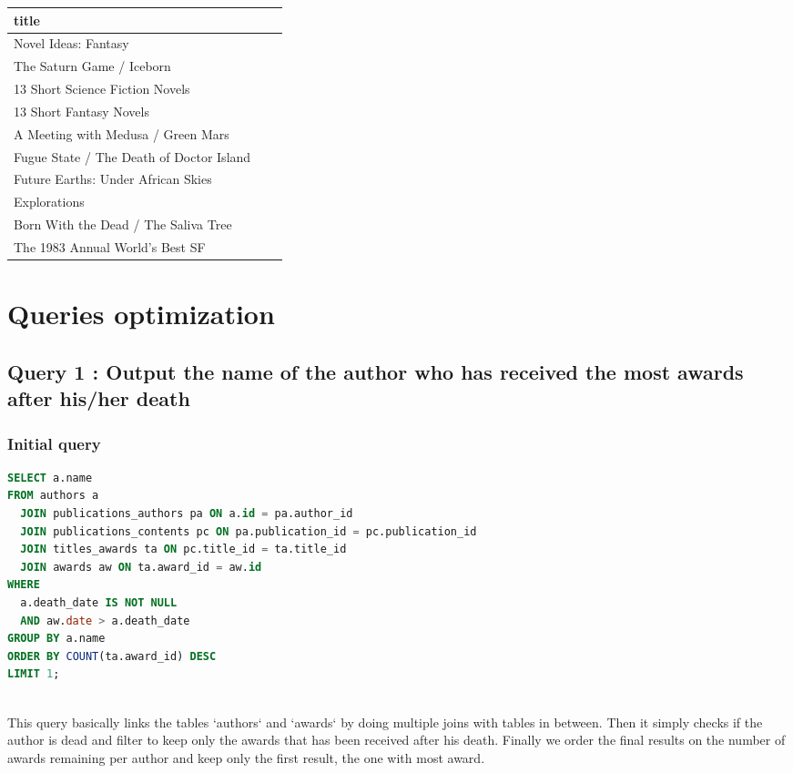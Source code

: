 \documentclass[doubleside, titlepage]{article}
\begin{document}
\begin{enumerate}
	\begin{tabular}{|l|c|r|}
	  \hline
		title\\
	  \hline
Novel Ideas: Fantasy\\
The Saturn Game / Iceborn\\
13 Short Science Fiction Novels\\
13 Short Fantasy Novels\\
A Meeting with Medusa / Green Mars\\
Fugue State / The Death of Doctor Island\\
Future Earths: Under African Skies\\
Explorations\\
Born With the Dead / The Saliva Tree\\
The 1983 Annual World's Best SF\\
	  \hline
	\end{tabular}
\end{enumerate}

\newpage

\section{Queries optimization}

\subsection{Query 1 : Output the name of the author who has received the most awards after his/her death}

\subsubsection{Initial query}
		\begin{lstlisting}[language=SQL,showspaces=false,basicstyle=\ttfamily,numberstyle=\tiny,commentstyle=\color{gray}]
SELECT a.name
FROM authors a
  JOIN publications_authors pa ON a.id = pa.author_id
  JOIN publications_contents pc ON pa.publication_id = pc.publication_id
  JOIN titles_awards ta ON pc.title_id = ta.title_id
  JOIN awards aw ON ta.award_id = aw.id
WHERE
  a.death_date IS NOT NULL
  AND aw.date > a.death_date
GROUP BY a.name
ORDER BY COUNT(ta.award_id) DESC
LIMIT 1;
		\end{lstlisting}
~\\	
This query basically links the tables `authors` and `awards` by doing multiple joins with tables in between. Then it simply checks if the author is dead and filter to keep only the awards that has been received after his death. Finally we order the final results on the number of awards remaining per author and keep only the first result, the one with most award.~\\
		
\end{document}
